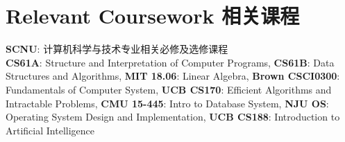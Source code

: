 \section*{ Relevant Coursework 相关课程}
\textbf{SCNU}: 计算机科学与技术专业相关必修及选修课程\\
\textbf{CS61A}: Structure and Interpretation of Computer Programs, \textbf{CS61B}: Data Structures  and Algorithms, \textbf{MIT 18.06}: Linear Algebra, \textbf{Brown CSCI0300}: Fundamentals of Computer System, \textbf{UCB CS170}: Efficient Algorithms and Intractable Problems, \textbf{CMU 15-445}: Intro to Database System, \textbf{NJU OS}: Operating System Design and Implementation, \textbf{UCB CS188}: Introduction to Artificial Intelligence